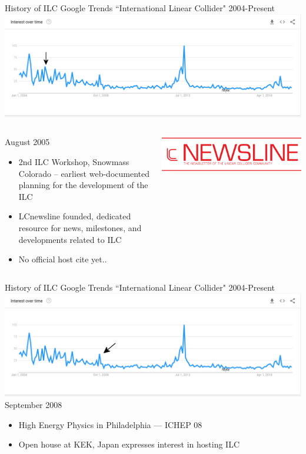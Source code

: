 \documentclass[10pt]{beamer}
\begin{document}
\begin{frame}{History of ILC}
Google Trends ``International Linear Collider" 2004-Present
\includegraphics[scale=0.25]{timeline2.png}\\
\begin{columns}
\begin{column}{0.5\textwidth}

August 2005 
\begin{itemize}
\scriptsize
\item 2nd ILC Workshop, Snowmass Colorado -- earliest web-documented planning for the development of the ILC 

\item LCnewsline founded, dedicated resource for news, milestones, and developments related to ILC
\item No official host cite yet..
\end{itemize}
\end{column}
\begin{column}{0.5\textwidth}
\includegraphics[scale=0.2]{lcnews.png}\\

\end{column}
\end{columns}
\end{frame}
\begin{frame}{History of ILC}
Google Trends ``International Linear Collider" 2004-Present
\includegraphics[scale=0.25]{timeline3.png}\\
September 2008 
\begin{itemize}
\item High Energy Physics in Philadelphia — ICHEP 08 
\item Open house at KEK, Japan expresses interest in hosting ILC
\end{itemize} 
\end{frame}
\end{document}
